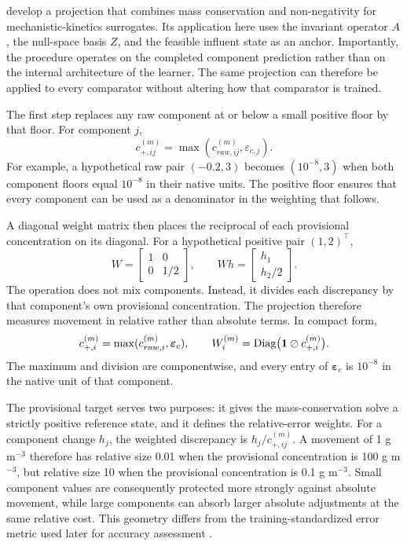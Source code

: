 \citet{KircherVotsmeier2025} develop a projection that combines mass conservation and non-negativity for mechanistic-kinetics surrogates. Its application here uses the invariant operator $A$, the null-space basis $Z$, and the feasible influent state as an anchor. Importantly, the procedure operates on the completed component prediction rather than on the internal architecture of the learner. The same projection can therefore be applied to every comparator without altering how that comparator is trained.

The first step replaces any raw component at or below a small positive floor by that floor. For component $j$,
\[
c_{+,ij}^{(m)}=\max(c_{raw,ij}^{(m)},\varepsilon_{c,j}).
\]
For example, a hypothetical raw pair $(-0.2,3)$ becomes $(10^{-8},3)$ when both component floors equal $10^{-8}$ in their native units. The positive floor ensures that every component can be used as a denominator in the weighting that follows.

A diagonal weight matrix then places the reciprocal of each provisional concentration on its diagonal. For a hypothetical positive pair $(1,2)^\top$,
\[
W=\begin{bmatrix}1&0\\0&1/2\end{bmatrix},\qquad
Wh=\begin{bmatrix}h_1\\h_2/2\end{bmatrix}.
\]
The operation does not mix components. Instead, it divides each discrepancy by that component's own provisional concentration. The projection therefore measures movement in relative rather than absolute terms. In compact form,
\begin{equation}
\equationname{Positive provisional target and relative projection weights}
c_{+,i}^{(m)}=\max(c_{raw,i}^{(m)},\boldsymbol{\varepsilon}_c),\qquad
W_i^{(m)}=\operatorname{Diag}\bigl(\mathbf{1}\oslash c_{+,i}^{(m)}\bigr).
\label{eq:projection_positive_target}
\end{equation}
The maximum and division are componentwise, and every entry of $\boldsymbol{\varepsilon}_c$ is $10^{-8}$ in the native unit of that component.

The provisional target serves two purposes: it gives the mass-conservation solve a strictly positive reference state, and it defines the relative-error weights. For a component change $h_j$, the weighted discrepancy is
$h_j/c_{+,ij}^{(m)}$.
A movement of 1 g m$^{-3}$ therefore has relative size 0.01 when the provisional concentration is 100 g m$^{-3}$, but relative size 10 when the provisional concentration is 0.1 g m$^{-3}$. Small component values are consequently protected more strongly against absolute movement, while large components can absorb larger absolute adjustments at the same relative cost. This geometry differs from the training-standardized error metric used later for accuracy assessment \citep{KircherVotsmeier2025,SturmSilva2024}.

